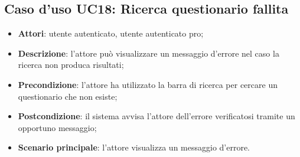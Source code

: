 \subsection{Caso d'uso UC18: Ricerca questionario fallita}
\label{UC18}
\begin{itemize}
\item\textbf{Attori}: utente autenticato, utente autenticato pro;
\item\textbf{Descrizione}: l'attore può visualizzare un messaggio d'errore nel caso la ricerca non produca risultati;
\item\textbf{Precondizione}: l'attore ha utilizzato la barra di ricerca per cercare un questionario che non esiste;
\item\textbf{Postcondizione}: il sistema avvisa l'attore dell'errore verificatosi tramite un opportuno messaggio;
\item\textbf{Scenario principale}: l'attore visualizza un messaggio d'errore.
\end{itemize}